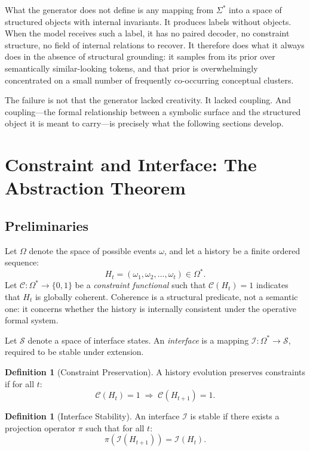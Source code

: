\documentclass[12pt, a4paper]{article}
\theoremstyle{plain}
\theoremstyle{definition}
\newtheorem{definition}[theorem]{Definition}
\theoremstyle{remark}
\begin{document}
What the generator does not define is any mapping from $\Sigma^*$ into a space of structured objects with internal invariants. It produces labels without objects. When the model receives such a label, it has no paired decoder, no constraint structure, no field of internal relations to recover. It therefore does what it always does in the absence of structural grounding: it samples from its prior over semantically similar-looking tokens, and that prior is overwhelmingly concentrated on a small number of frequently co-occurring conceptual clusters.

The failure is not that the generator lacked creativity. It lacked coupling. And coupling---the formal relationship between a symbolic surface and the structured object it is meant to carry---is precisely what the following sections develop.

\section{Constraint and Interface: The Abstraction Theorem}

\subsection{Preliminaries}

Let $\Omega$ denote the space of possible events $\omega$, and let a history be a finite ordered sequence:
\[
H_t = (\omega_1, \omega_2, \dots, \omega_t) \in \Omega^*.
\]
Let $\mathcal{C} : \Omega^* \to \{0,1\}$ be a \emph{constraint functional} such that $\mathcal{C}(H_t) = 1$ indicates that $H_t$ is globally coherent. Coherence is a structural predicate, not a semantic one: it concerns whether the history is internally consistent under the operative formal system.

Let $\mathcal{S}$ denote a space of interface states. An \emph{interface} is a mapping $\mathcal{I} : \Omega^* \to \mathcal{S}$, required to be stable under extension.

\begin{definition}[Constraint Preservation]
A history evolution preserves constraints if for all $t$:
\[
\mathcal{C}(H_t) = 1 \;\Rightarrow\; \mathcal{C}(H_{t+1}) = 1.
\]
\end{definition}

\begin{definition}[Interface Stability]
An interface $\mathcal{I}$ is stable if there exists a projection operator $\pi$ such that for all $t$:
\[
\pi(\mathcal{I}(H_{t+1})) = \mathcal{I}(H_t).
\]
\end{definition}
\end{document}
